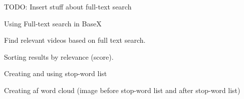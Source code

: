 TODO: Insert stuff about full-text search

Using Full-text search in BaseX

Find relevant videos based on full text search.

Sorting results by relevance (score).

Creating and using stop-word list

Creating af word cloud
(image before stop-word list and after stop-word list)